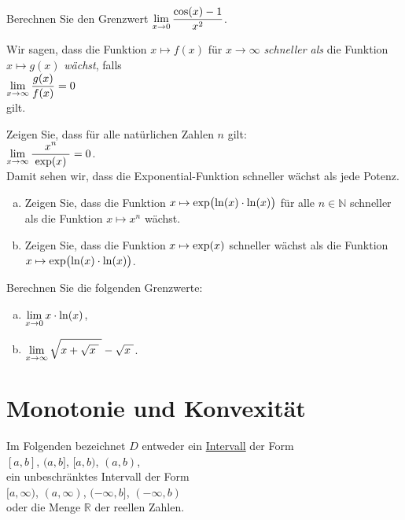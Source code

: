 \exercise
Berechnen Sie den Grenzwert \quad $\displaystyle\lim\limits_{x \rightarrow 0} \frac{\cos(x) - 1}{x^2}$. \eox


\begin{Definition} \lb
  Wir sagen, dass die Funktion $x \mapsto f(x)$ f\"ur $x \rightarrow \infty$ \emph{schneller als} die
  Funktion $x \mapsto g(x)$ \emph{w\"achst}, falls 
  \\[0.2cm]
  \hspace*{1.3cm}
  $\displaystyle \lim\limits_{x \rightarrow \infty} \frac{g(x)}{f(x)} = 0$
  \\[0.2cm]
  gilt. \eox
\end{Definition}

\exercise
Zeigen Sie, dass f\"ur alle nat\"urlichen Zahlen $n$ gilt: 
\\[0.3cm]
\hspace*{1.3cm} $\lim\limits_{x \rightarrow \infty} \displaystyle\frac{\;\displaystyle x^n\;}{\;\displaystyle\exp(x)\;} = 0$.
\\[0.3cm]
Damit sehen wir, dass die Exponential-Funktion schneller w\"achst als jede Potenz.  
\eox

\exercise
\begin{enumerate}[(a)]
\item Zeigen Sie, dass die Funktion $\displaystyle x \mapsto \exp\bigl(\ln(x) \cdot \ln(x)\bigr)$ f\"ur alle $n \in \mathbb{N}$ schneller
      als die Funktion $x \mapsto x^n$ w\"achst.
\item Zeigen Sie, dass die Funktion $\displaystyle x \mapsto \exp(x)$ schneller w\"achst als die Funktion
      $\displaystyle x \mapsto \exp\bigl(\ln(x) \cdot \ln(x)\bigr)$. \eox
\end{enumerate} 

\exercise
Berechnen Sie die folgenden Grenzwerte:
\begin{enumerate}[(a)]
\item $\displaystyle\lim\limits_{x \rightarrow 0} x \cdot \ln(x)$,
\item $\displaystyle\lim\limits_{x \rightarrow \infty} \sqrt{x + \sqrt{x\;}\;} - \sqrt{x\;}$.  \eox
\end{enumerate}

\section{Monotonie und Konvexit\"at}
Im Folgenden bezeichnet $D$ entweder ein
\href{http://de.wikipedia.org/wiki/Intervall_(Mathematik)}{Intervall} der Form
\\[0.2cm]
\hspace*{1.3cm}
$[a, b]$, \quad  
$(a, b]$, \quad   
$[a, b)$, \quad    
$(a, b)$,
\\[0.2cm]
ein unbeschr\"anktes Intervall der Form
\\[0.2cm]
\hspace*{1.3cm}
$[a, \infty)$, \quad      
$(a, \infty)$, \quad       
$(-\infty, b]$, \quad        
$(-\infty, b)$ \quad        
\\[0.2cm]
oder die Menge $\mathbb{R}$ der reellen Zahlen.

